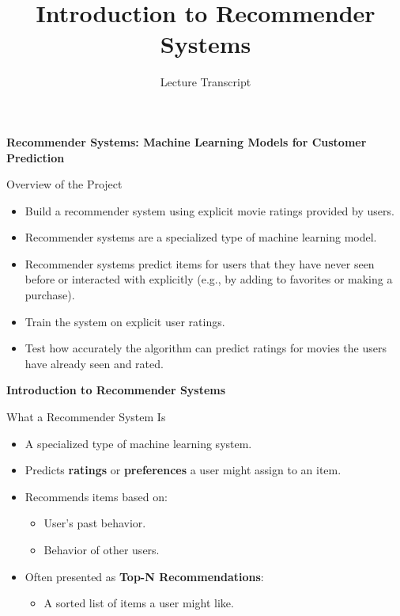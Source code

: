 \documentclass{beamer}
\title{Introduction to Recommender Systems}
\author{Lecture Transcript}
\date{}
\begin{document}

\begin{frame}[plain]
    \begin{center}
        {\LARGE \textbf{Recommender Systems: Machine Learning Models for Customer Prediction}}
    \end{center}
\end{frame}

\begin{frame}{Overview of the Project}
\begin{itemize}
    \item Build a recommender system using explicit movie ratings provided by users.
    \item Recommender systems are a specialized type of machine learning model.
    \item Recommender systems predict items for users that they have never seen before or interacted with explicitly (e.g., by adding to favorites or making a purchase).
    \item Train the system on explicit user ratings.
    \item Test how accurately the algorithm can predict ratings for movies the users have already seen and rated.
\end{itemize}
\end{frame}

\begin{frame}[plain]
    \begin{center}
        {\LARGE \textbf{Introduction to Recommender Systems}}
    \end{center}
\end{frame}

\begin{frame}{What a Recommender System Is}
\begin{itemize}
    \item A specialized type of machine learning system.
    \item Predicts \textbf{ratings} or \textbf{preferences} a user might assign to an item.
    \item Recommends items based on:
    \begin{itemize}
        \item User's past behavior.
        \item Behavior of other users.
    \end{itemize}
    \item Often presented as \textbf{Top-N Recommendations}:
    \begin{itemize}
        \item A sorted list of items a user might like.
    \end{itemize}
\end{itemize}
\end{frame}
\end{document}
